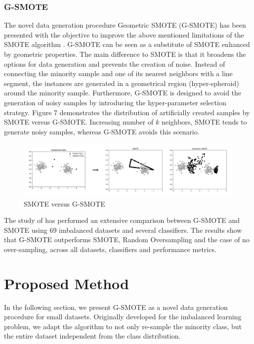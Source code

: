 \documentclass[parskip=full]{scrartcl}
\begin{document}
\subsubsection{G-SMOTE}

The novel data generation procedure Geometric SMOTE (G-SMOTE) has been presented with the 
objective to improve the above mentioned limitations of the SMOTE algorithm \cite{Douzas.2019b}. 
G-SMOTE can be seen as a substitute of SMOTE enhanced by geometric properties. The main 
difference to SMOTE is that it broadens the options for data generation and prevents the creation of 
noise. Instead of connecting the minority sample and one of its nearest neighbors with a line segment, 
the instances are generated in a geometrical region (hyper-spheroid) around the minority sample. 
Furthermore, G-SMOTE is designed to avoid the generation of noisy samples by introducing the 
hyper-parameter selection strategy. Figure 7 demonstrates the distribution of artificially created 
samples by SMOTE versus G-SMOTE. Increasing number of $\mathit{k}$ neighbors, SMOTE tends to 
generate noisy samples, whereas G-SMOTE avoids this scenario.

\begin{figure}[H]
	\centering
	\includegraphics[width=1\linewidth]{../analysis/smote_vs_gsmote}
	\caption{SMOTE versus G-SMOTE \cite{Douzas.2019}}
	\label{fig:smotevsgsmote}
\end{figure}

The study of \cite{Douzas.2019b} has performed an extensive comparison between G-SMOTE and 
SMOTE using 69 imbalanced datasets and several classifiers. The results show that G-SMOTE 
outperforms SMOTE, Random Oversampling and the case of no over-sampling, across all datasets, 
classifiers and performance metrics.

\section{Proposed Method}

In the following section, we present G-SMOTE as a novel data generation procedure for small datasets. 
Originally developed for the imbalanced learning problem, we adapt the algorithm to not only re-sample 
the minority class, but the entire dataset independent from the class distribution. 
\end{document}
